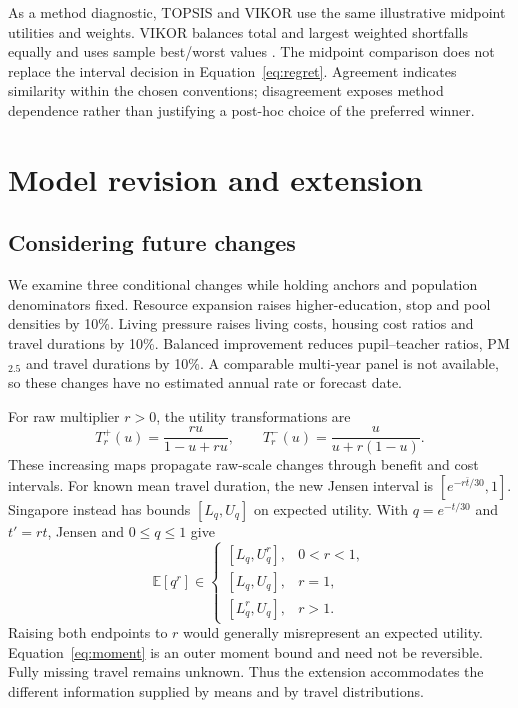 As a method diagnostic, TOPSIS and VIKOR use the same illustrative midpoint
utilities and weights. VIKOR balances total and largest weighted shortfalls
equally and uses sample best/worst values \cite{vikor}. \MethodComparison
The midpoint comparison does not replace the interval decision in
Equation~\ref{eq:regret}. Agreement indicates similarity within the chosen
conventions; disagreement exposes method dependence rather than justifying a
post-hoc choice of the preferred winner.

\FloatBarrier


\section{Model revision and extension}
\subsection{Considering future changes}
We examine three conditional changes while holding anchors and population
denominators fixed. Resource expansion raises higher-education, stop and pool
densities by 10\%. Living pressure raises living costs, housing cost ratios and
travel durations by 10\%. Balanced improvement reduces pupil--teacher ratios,
PM$_{2.5}$ and travel durations by 10\%. A comparable multi-year panel is not
available, so these changes have no estimated annual rate or forecast date.

For raw multiplier $r>0$, the utility transformations are
\begin{equation}
 T_r^{+}(u)=\frac{ru}{1-u+ru},\qquad
 T_r^{-}(u)=\frac{u}{u+r(1-u)}.
\end{equation}
These increasing maps propagate raw-scale changes through benefit and cost
intervals. For known mean travel duration, the new Jensen interval is
$[e^{-r\bar t/30},1]$. Singapore instead has bounds $[L_q,U_q]$ on expected
utility. With $q=e^{-t/30}$ and $t'=rt$, Jensen and $0\leq q\leq1$ give
\begin{equation}
 \mathbb E[q^r]\in
 \begin{cases}
 [L_q,U_q^r],&0<r<1,\\
 [L_q,U_q],&r=1,\\
 [L_q^r,U_q],&r>1.
 \end{cases}
 \label{eq:moment}
\end{equation}
Raising both endpoints to $r$ would generally misrepresent an expected utility.
Equation~\ref{eq:moment} is an outer moment bound and need not be reversible.
Fully missing travel remains unknown. Thus the extension accommodates the
different information supplied by means and by travel distributions.

